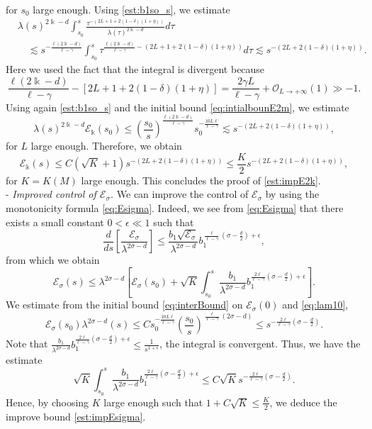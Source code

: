 \documentclass[11pt]{aims}
\theoremstyle{definition}
\numberwithin{equation}{section}
\begin{document}
for $s_0$ large enough. Using \eqref{est:b1so_s}, we estimate
\begin{align*}
&\lambda(s)^{2\Bbbk - d}\int_{s_0}^s\frac{\tau^{-(2L + 1 + 2(1 - \delta)(1 + \eta))}}{\lambda(\tau)^{2\Bbbk - d}}d\tau\\
& \quad \lesssim s^{- \frac{\ell(2\Bbbk - d)}{\ell - \gamma}}\int_{s_0}^s \tau^{\frac{\ell(2\Bbbk - d)}{\ell - \gamma} - (2L + 1 + 2(1 - \delta)(1 + \eta))}d\tau \lesssim s^{-(2L + 2(1 - \delta)(1 + \eta))}.
\end{align*}
Here we used the fact that the integral is divergent because
$$\frac{\ell(2\Bbbk - d)}{\ell - \gamma} - [2L + 1 + 2(1 - \delta)(1 + \eta)] = \frac{2\gamma L}{\ell - \gamma} + {\mathcal{O}}_{L \to +\infty}(1) \gg -1.$$
Using again \eqref{est:b1so_s} and the initial bound \eqref{eq:intialbounE2m}, we estimate
$$\lambda(s)^{2\Bbbk - d}{\mathscr{E}}_{\Bbbk}(s_0) \leq \left(\frac{s_0}{s}\right)^\frac{\ell(2\Bbbk - d)}{\ell - \gamma} s_0^{-\frac{10L\ell}{\ell - \gamma}} \lesssim s^{-(2L + 2(1 - \delta)(1 + \eta))},$$
for $L$ large enough. Therefore, we obtain 
$${\mathscr{E}}_{\Bbbk}(s) \leq C\left(\sqrt K + 1\right)s^{-(2L + 2(1 - \delta)(1 + \eta))} \leq \frac{K}{2}s^{-(2L + 2(1 - \delta)(1 + \eta))}, $$
for $K = K(M)$ large enough. This concludes the proof of \eqref{est:impE2k}.\\

\noindent - \textit{Improved control of ${\mathscr{E}}_{\sigma}$.} We can improve the control of ${\mathscr{E}}_{\sigma}$ by using the monotonicity formula \eqref{eq:Esigma}. Indeed, we see from \eqref{eq:Esigma} that there exists a small constant $0 < \epsilon \ll 1$ such that 
$$\frac{d}{ds} \left[\frac{{\mathscr{E}}_\sigma}{\lambda^{2\sigma - d}}\right] \leq \frac{b_1\sqrt{{\mathscr{E}}_\sigma}}{\lambda^{2\sigma - d }}b_1^{\frac{\ell}{\ell - \gamma}\left(\sigma - \frac d2\right) + \epsilon},$$
from which  we obtain
$${\mathscr{E}}_\sigma(s) \leq \lambda^{2\sigma - d}\left[{\mathscr{E}}_\sigma(s_0) + \sqrt{K}\int_{s_0}^s \frac{b_1}{\lambda^{2\sigma -d}}b_1^{\frac{2\ell}{\ell - \gamma}\left(\sigma - \frac d2\right) + \epsilon}\right].$$
We estimate from the initial bound \eqref{eq:interBound} on ${\mathscr{E}}_\sigma(0)$ and \eqref{eq:lam10},
$${\mathscr{E}}_\sigma(s_0)\lambda^{2\sigma - d}(s) \leq C s_0^{-\frac{10L \ell}{\ell - \gamma}} \left(\frac{s_0}{s}\right)^{\frac{\ell}{\ell - \gamma} \left(2\sigma - d\right)} \leq s^{-\frac{2\ell}{\ell - \gamma}\left(\sigma - \frac d2\right)}.$$
Note that $\frac{b_1}{\lambda^{2\sigma -d}}b_1^{\frac{2\ell}{\ell - \gamma}\left(\sigma - \frac d2\right) + \epsilon} \leq \frac{1}{s^{1 + \epsilon}}$, the integral is convergent. Thus, we have the estimate
$$\sqrt{K}\int_{s_0}^s \frac{b_1}{\lambda^{2\sigma -d}}b_1^{\frac{2\ell}{\ell - \gamma}\left(\sigma - \frac d2\right) + \epsilon} \leq C\sqrt{K} s^{-\frac{2\ell}{\ell - \gamma}\left(\sigma - \frac d2\right)}.$$
Hence, by choosing $K$ large enough such that $1  +C\sqrt{K} \leq \frac{K}{2}$, we deduce the improve bound \eqref{est:impEsigma}.\\
  
\end{document}
